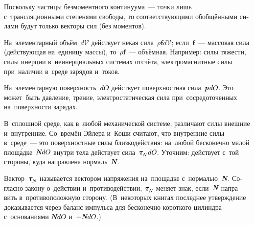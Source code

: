 \begin{otherlanguage}{russian}

Поскольку частицы безмоментного континуума~--- точки лишь с~трансляционными степенями свободы, то соответствующими обобщёнными силами будут только векторы сил (без моментов).

На~элементарный объём~$d\mathcal{V}$ действует некая сила~${\rho \bm{f} d\mathcal{V}}$; \hbox{если}~$\bm{f}$~--- массовая сила (действующая на~единицу массы), то~${\rho \bm{f}}$~--- объёмная. Например: силы тяжести, силы инерции в~неинерциальных системах отсчёта, электромагнитные силы при~наличии в~среде зарядов и~токов.

На~элементарную поверхность~$dO\hspace{-0.12ex}$ действует поверхностная сила~${\bm{p} \hspace{0.2ex} dO\hspace{-0.12ex}}$. Это может~быть давление, трение, электростатическая сила при~сосредоточенных на~поверхности зарядах.

В~сплошной среде, как в~любой механической системе, различают силы внешние и~внутренние. Со~времён Эйлера и~Коши считают, что внутренние силы в~среде~--- это поверхностные силы близкодействия: на~любой бесконечно малой площ\'{а}дке~${\mathboldN dO\hspace{-0.12ex}}$ внутри тела действует сила~${\cauchystress_{\hspace{-0.2ex}\raisemath{-0.1em}{N}\hspace{0.1ex}} dO\hspace{-0.12ex}}$. Уточним: действует с~той стороны, куда направлена нормаль~$\mathboldN$.

Вектор~${\cauchystress_{\hspace{-0.2ex}\raisemath{-0.1em}{N}}\hspace{-0.1ex}}$ называется вектором напряжения на~площадке с~нормалью~$\mathboldN$. Согласно закону о~действии и~противодействии, ${\cauchystress_{\hspace{-0.2ex}\raisemath{-0.1em}{N}}\hspace{-0.1ex}}$ меняет знак, если~$\mathboldN$ направить в~противоположную сторону.
(В~некоторых книгах последнее утверждение доказывается через баланс импульса для бесконечно короткого цилиндра с~основаниями ${\mathboldN dO\hspace{-0.12ex}}$ и~${- \hspace{0.1ex} \mathboldN dO\hspace{-0.12ex}}$.)


\end{otherlanguage}
